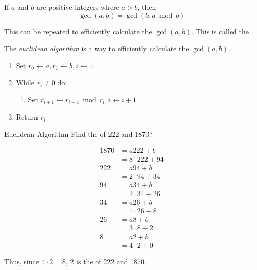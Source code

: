 \begin{lemma}\label{lemma:Compute_GCD}
  If $a$ and $b$ are positive integers where $a > b$, then
  \begin{equation}\label{eq:Compute_GCD}
    \gcd(a, b) = \gcd(b, a \bmod b)
  \end{equation}
  \begin{remark*}
    This can be repeated to efficiently calculate the $\gcd(a, b)$.
    This is called the .
  \end{remark*}
\end{lemma}

\begin{definition}\label{def:Euclidean_Algorithm}
  The \emph{euclidean algorithm} is a way to efficiently calculate the $\gcd(a, b)$.
  \begin{enumerate}[noitemsep]
  \item Set $r_{0} \leftarrow a, r_{1} \leftarrow b, i \leftarrow 1$.
  \item While $r_{i} \neq 0$ do:
    \begin{enumerate}[noitemsep]
    \item Set $r_{i+1} \leftarrow r_{i-1} \bmod r_{i}, i \leftarrow i+1$
    \end{enumerate}
  \item Return $r_{i}$
  \end{enumerate}
\end{definition}

\begin{example}{Euclidean Algorithm}
  Find the  of 222 and 1870?

  \tcblower{}

  \begin{align*}
    1870 &= a 222 + b \\
         &= 8 \cdot 222 + 94 \\
    222 &= a 94 + b \\
         &= 2 \cdot 94 + 34 \\
    94 &= a 34 + b \\
         &= 2 \cdot 34 + 26 \\
    34 &= a 26 + b \\
         &= 1 \cdot 26 + 8 \\
    26 &= a 8 + b \\
         &= 3 \cdot 8 + 2 \\
    8 &= a 2 + b \\
         &= 4 \cdot 2 + 0
  \end{align*}

  Thus, since $4 \cdot 2 = 8$, 2 is the  of 222 and 1870.
\end{example}

